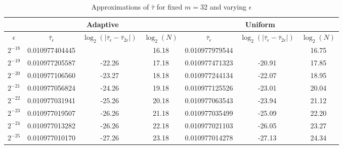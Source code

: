 \documentclass[a4paper, oneside, reqno]{amsart}
\newcommand{\abs}[1]{\left\lvert#1\right\rvert}
\theoremstyle{remark}
\begin{document}
\begin{table}
  \scriptsize
  \center
  \begin{tabular}{c | c c c | c c c}
    \hline
                 & \multicolumn{3}{c}{Adaptive} & \multicolumn{3}{c}{Uniform} \\
    \hline
    \(\epsilon\) & \(\bar\tau_\epsilon\) & \(\log_2(\abs{\bar\tau_{\epsilon}-\bar\tau_{2\epsilon}})\) & \(\log_{2}(N)\) & \(\bar\tau_\epsilon\) & \(\log_2(\abs{\bar\tau_{\epsilon}-\bar\tau_{2\epsilon}})\) & \(\log_{2}(N)\) \\
    \hline
    \(2^{-18}\) & 0.010977404445 &        & 16.18 & 0.010977979544 &        & 16.75 \\
    \(2^{-19}\) & 0.010977205587 & -22.26 & 17.18 & 0.010977471323 & -20.91 & 17.85 \\
    \(2^{-20}\) & 0.010977106560 & -23.27 & 18.18 & 0.010977244134 & -22.07 & 18.95 \\
    \(2^{-21}\) & 0.010977056824 & -24.26 & 19.18 & 0.010977125526 & -23.01 & 20.04 \\
    \(2^{-22}\) & 0.010977031941 & -25.26 & 20.18 & 0.010977063543 & -23.94 & 21.12 \\
    \(2^{-23}\) & 0.010977019507 & -26.26 & 21.18 & 0.010977035499 & -25.09 & 22.20 \\
    \(2^{-24}\) & 0.010977013282 & -26.26 & 22.18 & 0.010977021103 & -26.05 & 23.27 \\
    \(2^{-25}\) & 0.010977010170 & -27.26 & 23.18 & 0.010977014278 & -27.13 & 24.34 \\
    \hline    
  \end{tabular}
  \caption{Approximations of \(\bar\tau\) for fixed \(m = 32\) and varying \(\epsilon\)}
  \label{tab:resultsFixedNVaryEps}
\end{table}
\end{document}
